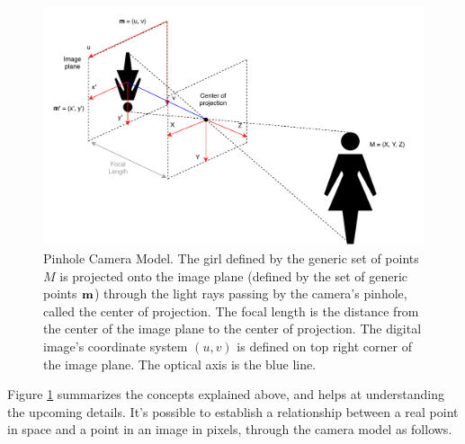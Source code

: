 \begin{figure}[ht]
	\centering
	\includegraphics[width=\textwidth]{images/cameraconcepts.pdf}
	\caption[Pinhole Camera Model]{Pinhole Camera Model. The girl defined by the generic set of points $M$ is projected onto the image plane (defined by the set of generic points $\bf m$) through the light rays passing by the camera's pinhole, called the center of projection. The focal length is the distance from the center of the image plane to the center of projection. The digital image's coordinate system $(u, v)$ is defined on top right corner of the image plane. The optical axis is the blue line.}
	\label{cha2:sec2:fig:camera_concepts}
\end{figure}

Figure \ref{cha2:sec2:fig:camera_concepts} summarizes the concepts explained above, and helps at understanding the upcoming details. It's possible to establish a relationship between a real point in space and a point in an image in pixels, through the camera model as follows.

